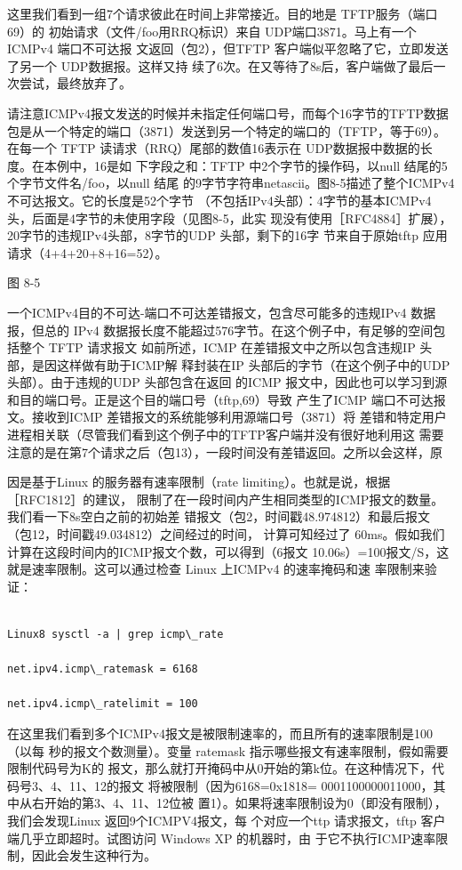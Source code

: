 这里我们看到一组7个请求彼此在时间上非常接近。目的地是 TFTP服务（端口 69）的
初始请求（文件/foo用RRQ标识）来自 UDP端口3871。马上有一个ICMPv4 端口不可达报
文返回（包2），但TFTP 客户端似平忽略了它，立即发送了另一个 UDP数据报。这样又持
续了6次。在又等待了8s后，客户端做了最后一次尝试，最终放弃了。

请注意ICMPv4报文发送的时候并未指定任何端口号，而每个16字节的TFTP数据
包是从一个特定的端口（3871）发送到另一个特定的端口的（TFTP，等于69）。在每一个
TFTP 读请求（RRQ）尾部的数值16表示在 UDP数据报中数据的长度。在本例中，16是如
下字段之和：TFTP 中2个字节的操作码，以null 结尾的5个字节文件名/foo，以null 结尾
的9字节字符串netascii。图8-5描述了整个ICMPv4不可达报文。它的长度是52个字节
（不包括IPv4头部）：4字节的基本ICMPv4 头，后面是4字节的未使用字段（见图8-5，此实
现没有使用［RFC4884］扩展），20字节的违规IPv4头部，8字节的UDP 头部，剩下的16字
节来自于原始tftp 应用请求（4+4+20+8+16=52）。

图 8-5

一个ICMPv4目的不可达-端口不可达差错报文，包含尽可能多的违规IPv4 数据报，但总的
IPv4 数据报长度不能超过576字节。在这个例子中，有足够的空间包括整个 TFTP 请求报文
如前所述，ICMP 在差错报文中之所以包含违规IP 头部，是因这样做有助于ICMP解
释封装在IP 头部后的字节（在这个例子中的UDP头部）。由于违规的UDP 头部包含在返回
的ICMP 报文中，因此也可以学习到源和目的端口号。正是这个目的端口号（tftp,69）导致
产生了ICMP 端口不可达报文。接收到ICMP 差错报文的系统能够利用源端口号（3871）将
差错和特定用户进程相关联（尽管我们看到这个例子中的TFTP客户端并没有很好地利用这
需要注意的是在第7个请求之后（包13），一段时间没有差错返回。之所以会这样，原

因是基于Linux 的服务器有速率限制（rate limiting）。也就是说，根据［RFC1812］的建议，
限制了在一段时间内产生相同类型的ICMP报文的数量。我们看一下8s空白之前的初始差
错报文（包2，时间戳48.974812）和最后报文（包12，时间戳49.034812）之间经过的时间，
计算可知经过了 60ms。假如我们计算在这段时间内的ICMP报文个数，可以得到（6报文
10.06s）=100报文/S，这就是速率限制。这可以通过检查 Linux 上ICMPv4 的速率掩码和速
率限制来验证：

\begin{verbatim}
	
Linux8 sysctl -a | grep icmp\_rate

net.ipv4.icmp\_ratemask = 6168

net.ipv4.icmp\_ratelimit = 100
\end{verbatim}

在这里我们看到多个ICMPv4报文是被限制速率的，而且所有的速率限制是100（以每
秒的报文个数测量）。变量 ratemask 指示哪些报文有速率限制，假如需要限制代码号为K的
报文，那么就打开掩码中从0开始的第k位。在这种情况下，代码号3、4、11、12的报文
将被限制（因为6168=0x1818= 0001100000011000，其中从右开始的第3、4、11、12位被
置1）。如果将速率限制设为0（即没有限制），我们会发现Linux 返回9个ICMPV4报文，每
个对应一个ttp 请求报文，tftp 客户端几乎立即超时。试图访问 Windows XP 的机器时，由
于它不执行ICMP速率限制，因此会发生这种行为。

